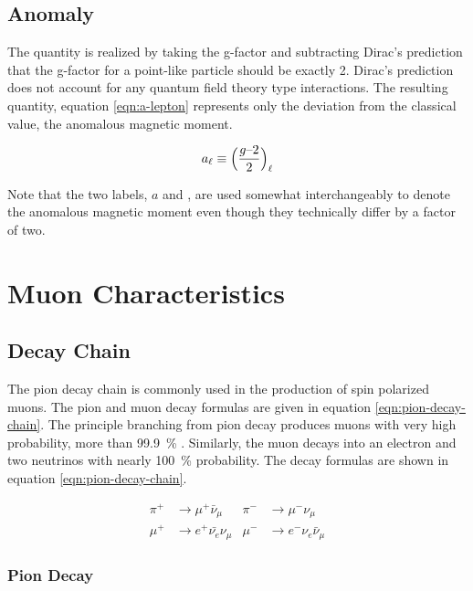 \subsection{Anomaly}
The quantity \gmtwo is realized by taking the g-factor and subtracting Dirac's prediction that the g-factor for a point-like particle should be exactly 2.  Dirac's prediction does not account for any quantum field theory type interactions.  The resulting \gmtwo quantity, equation \ref{eqn:a-lepton} represents only the deviation from the classical value, the anomalous magnetic moment.

\begin{equation}
\label{eqn:a-lepton}
a_{\ell} \equiv \Big(\frac{g\hbox{--}2}{2} \Big)_\ell
\end{equation}

\noindent
Note that the two labels, $a$ and \gmtwo, are used somewhat interchangeably to denote the anomalous magnetic moment even though they technically differ by a factor of two.

\section{Muon Characteristics}

\subsection{Decay Chain}

The pion decay chain is commonly used in the production of spin polarized muons.  The pion and muon decay formulas are given in equation \ref{eqn:pion-decay-chain}.  The principle branching from pion decay produces muons with very high probability, more than \SI{99.9}{\percent} \cite{pdg-2016}.  Similarly, the muon decays into an electron and two neutrinos with nearly \SI{100}{\percent} probability.  The decay formulas are shown in equation \ref{eqn:pion-decay-chain}.

\begin{align}
\label{eqn:pion-decay-chain}
\pi^+ & \rightarrow \mu^+ \bar{\nu}_\mu  & \pi^- & \rightarrow \mu^- \nu_\mu \\
\mu^+ & \rightarrow e^+ \bar{\nu_e} \nu_\mu  & \mu^- & \rightarrow e^- \nu_e \bar{\nu}_\mu 
\end{align}

\subsubsection{Pion Decay}


